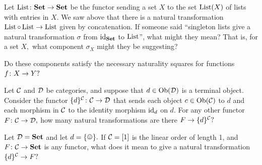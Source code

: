 \documentclass[../main/CT4S-EN-RU]{subfiles}
\begin{document}
\begin{exerciseRUS}
\end{exerciseRUS}

\begin{exerciseENG}
Let $\operatorname{List}\colon{\mathbf{Set}}\rightarrow{\mathbf{Set}}$ be the functor sending a set $X$ to the set $\operatorname{List}(X)$ of lists with entries in $X.$ We saw above that there is a natural transformation $\operatorname{List}\circ\operatorname{List}\rightarrow\operatorname{List}$ given by concatenation.
\sexc If someone said “singleton lists give a natural transformation $\sigma$ from $\operatorname{id}_{\mathbf{Set}}$ to $\operatorname{List}$”, what might they mean? That is, for a set $X,$ what component $\sigma_X$ might they be suggesting?
\item Do these components satisfy the necessary naturality squares for functions $f\colon X\rightarrow Y?$
\endsexc
\end{exerciseENG}

\begin{exerciseRUS}
\end{exerciseRUS}

\begin{exerciseENG}
Let $\mathcal{C}$ and $\mathcal{D}$ be categories, and suppose that $d\in\operatorname{Ob}(\mathcal{D})$ is a terminal object. Consider the functor $\{d\}^\mathcal{C}\colon\mathcal{C}\rightarrow\mathcal{D}$ that sends each object $c\in\operatorname{Ob}(\mathcal{C})$ to $d$ and each morphism in $\mathcal{C}$ to the identity morphism $\operatorname{id}_d$ on $d.$ 
\sexc For any other functor $F\colon\mathcal{C}\rightarrow\mathcal{D},$ how many natural transformations are there $F\rightarrow\{d\}^\mathcal{C}?$ 
\item Let $\mathcal{D}={\mathbf{Set}}$ and let $d=\singleton.$ If $\mathcal{C}=[1]$ is the linear order of length 1, and $F\colon\mathcal{C}\rightarrow{\mathbf{Set}}$ is any functor, what does it mean to give a natural transformation $\{d\}^\mathcal{C}\rightarrow F?$
\endsexc
\end{exerciseENG}

\begin{exerciseRUS}
\end{exerciseRUS}
\end{document}
